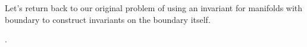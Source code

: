 Let's return back to our original problem of using an invariant for manifolds with boundary to construct invariants on the boundary itself.


\bigskip

\begin{remark}
	 \cite{witten1985global}.
\end{remark}


